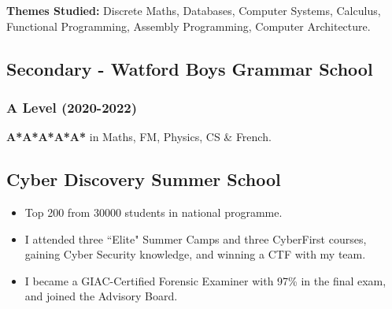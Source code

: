 \documentclass{Resume}
\begin{document}
		    \textbf{Themes Studied:} Discrete Maths, Databases, Computer Systems, Calculus, Functional Programming, Assembly Programming, Computer Architecture. 


    
		\subsection{Secondary - Watford Boys Grammar School}
		    \subsubsection{A Level (2020-2022)}
		    \textbf{A*A*A*A*A*} in Maths, FM, Physics, CS \& French.
		\subsection{Cyber Discovery Summer School}
				\begin{itemize}
				    \item Top 200 from 30000 students in national programme.
				    \item I attended three ``Elite" Summer Camps and three CyberFirst courses, gaining Cyber Security knowledge, and winning a CTF with my team.
				    \item I became a GIAC-Certified Forensic Examiner with 97\% in the final exam, and joined the Advisory Board.
				\end{itemize}
\end{document}
